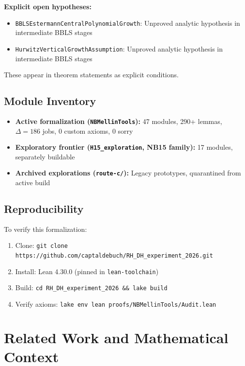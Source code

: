 \documentclass[11pt,a4paper]{article}
\theoremstyle{plain}
\theoremstyle{definition}
\theoremstyle{remark}
\begin{document}
\textbf{Explicit open hypotheses:}
\begin{itemize}[leftmargin=2em]
  \item \texttt{BBLSEstermannCentralPolynomialGrowth}: Unproved analytic hypothesis in intermediate BBLS stages
  \item \texttt{HurwitzVerticalGrowthAssumption}: Unproved analytic hypothesis in intermediate BBLS stages
\end{itemize}

These appear in theorem statements as explicit conditions.

\subsection{Module Inventory}

\begin{itemize}[leftmargin=2em]
  \item \textbf{Active formalization (\texttt{NBMellinTools}):} 47 modules, 290+ lemmas, $\Delta = 186$ jobs, 0 custom axioms, 0 sorry
  \item \textbf{Exploratory frontier (\texttt{H15\_exploration}, NB15 family):} 17 modules, separately buildable
  \item \textbf{Archived explorations (\texttt{route-c/}):} Legacy prototypes, quarantined from active build
\end{itemize}

\subsection{Reproducibility}

To verify this formalization:

\begin{enumerate}[label=\textbf{\arabic*.}]
  \item Clone: \texttt{git clone https://github.com/captaldebuch/RH\_DH\_experiment\_2026.git}
  \item Install: Lean 4.30.0 (pinned in \texttt{lean-toolchain})
  \item Build: \texttt{cd RH\_DH\_experiment\_2026 \&\& lake build}
  \item Verify axioms: \texttt{lake env lean proofs/NBMellinTools/Audit.lean}
\end{enumerate}

\section{Related Work and Mathematical Context}
\label{sec:related}
\end{document}
